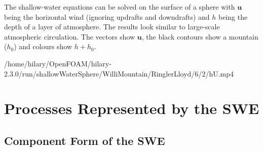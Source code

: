 \begin{minipage}[t]{0.24\columnwidth}%
\vspace{-1pt}
The shallow-water equations can be solved on the surface of a sphere
with $\mathbf{u}$ being the horizontal wind (ignoring updrafts and
downdrafts) and $h$ being the depth of a layer of atmosphere. The
results look similar to large-scale atmospheric circulation. The vectors
show $\mathbf{u}$, the black contours show a mountain ($h_{0}$)
and colours show $h+h_{0}$.%
\end{minipage} %
\begin{minipage}[t]{0.74\columnwidth}%
\vspace{-1pt}
{/home/hilary/OpenFOAM/hilary-2.3.0/run/shallowWaterSphere/WilliMountain/RinglerLloyd/6/2/hU.mp4}%
\end{minipage}

\clearpage{}


\section{Processes Represented by the SWE}

\clearpage{}


\subsection*{Component Form of the SWE}

